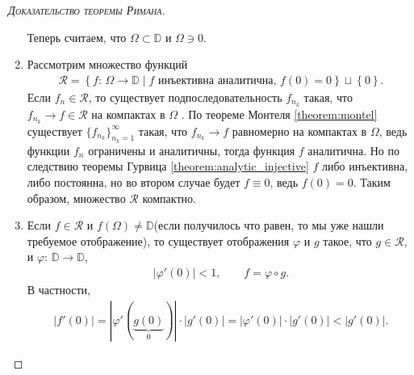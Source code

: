 \documentclass[../complex-analysis.tex]{subfiles}
\begin{document}
\begin{proof}[\normalfont\textsc{Доказательство теоремы Римана}]
\begin{enumerate}
   Теперь считаем, что $ \Omega \subset \mathbb D $ и $ \Omega \ni 0 $.

  \item Рассмотрим множество функций
   \begin{align*}
    \mathcal R = \left\{ f \colon\,\Omega \to \mathbb D \mid f \text{ инъективна аналитична, } f(0) = 0  \right\} \sqcup \left\{ 0 \right\}.
\end{align*} Если $ f_n \in \mathcal R$, то существует подпоследовательность $ f_{n_k} $ такая, что  $ f_{n_k} \to f \in \mathcal R $  на компактах в $ \Omega $ . По теореме Монтеля \eqref{theorem:montel} существует $ \{f_{n_k}\}_{n_k=1}^{\infty}   $ такая, что $ f_{n_k} \to f $ равномерно на компактах в $ \Omega $, ведь функции $ f_n $ ограничены и аналитичны, тогда функция $ f $ аналитична. Но по следствию теоремы Гурвица \eqref{theorem:analytic_injective} $ f $ либо инъективна, либо постоянна, но во втором случае будет $ f \equiv 0 $, ведь $ f(0) = 0 $. Таким образом, множество $ \mathcal R $ компактно.

  \item Если $ f \in \mathcal R $ и $ f(\Omega) \neq \mathbb D $(если получилось что равен, то мы уже нашли требуемое отображение), то существует отображения $ \varphi $ и $ g $ такое, что $ g \in \mathcal R $, и $ \varphi\colon\,\mathbb D \to \mathbb D $,
   \begin{align*}
    \left| \varphi'(0) \right| < 1, \qquad f = \varphi \circ g.
   \end{align*} В частности,
   \begin{align*}
	\left| f'(0) \right| = \left| \varphi'(\underbrace{g(0)}_{0}) \right| \cdot \left| g'(0) \right| = \left| \varphi'(0) \right| \cdot \left| g'(0) \right| < \left| g'(0) \right|.
   \end{align*}


\end{enumerate}
\end{proof}
\end{document}
